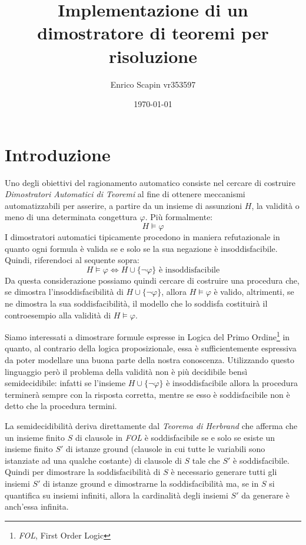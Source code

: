 \documentclass[a4paper,11pt]{article}
\title{\bf{Implementazione di un dimostratore di teoremi per risoluzione}}
\author{Enrico Scapin vr353597}
\date{\today}
\begin{document}
\maketitle

\small
\section{Introduzione}
Uno degli obiettivi del ragionamento automatico consiste nel cercare di costruire \emph{Dimostratori Automatici di Teoremi} al fine di ottenere meccanismi automatizzabili per asserire, a partire da un insieme di assunzioni $H$, la validità o meno di una determinata congettura $\varphi$. Più formalmente:
\[ H \models \varphi \]
I dimostratori automatici tipicamente procedono in maniera refutazionale in quanto ogni formula è valida se e solo se la sua negazione è insoddisfacibile. Quindi, riferendoci al sequente sopra:
\[ H \models \varphi \Longleftrightarrow H \cup \lbrace\neg \varphi\rbrace \text{ è insoddisfacibile} \]
Da questa considerazione possiamo quindi cercare di costruire una procedura che, se dimostra l'insoddisfacibilità di $H \cup \lbrace\neg \varphi\rbrace$, allora $ H \models \varphi $ è valido, altrimenti, se ne dimostra la sua soddisfacibilità, il modello che lo soddisfa costituirà il controesempio alla validità di $ H \models \varphi $.\par
Siamo interessati a dimostrare formule espresse in Logica del Primo Ordine\footnote{\emph{FOL}, First Order Logic} in quanto, al contrario della logica proposizionale, essa è sufficientemente espressiva da poter modellare una buona parte della nostra conoscenza. Utilizzando questo linguaggio però il problema della validità non è più decidibile bensì semidecidibile: infatti se l'insieme $H \cup \lbrace\neg \varphi\rbrace $ è insoddisfacibile allora la procedura terminerà sempre con la risposta corretta, mentre se esso è soddisfacibile non è detto che la procedura termini. \par
La semidecidibilità deriva direttamente dal \emph{Teorema di Herbrand} che afferma che un insieme finito $S$ di clausole in \emph{FOL} è soddisfacibile se e solo se esiste un insieme finito $S'$ di istanze ground (clausole in cui tutte le variabili sono istanziate ad una qualche costante) di clausole di $S$ tale che $S'$ è soddisfacibile. Quindi per dimostrare la soddisfacibilità di $S$ è necessario generare tutti gli insiemi $S'$ di istanze ground e dimostrarne la soddisfacibilità ma, se in $S$ si quantifica su insiemi infiniti, allora la cardinalità degli insiemi $S'$ da generare è anch'essa infinita.\par
\end{document}
